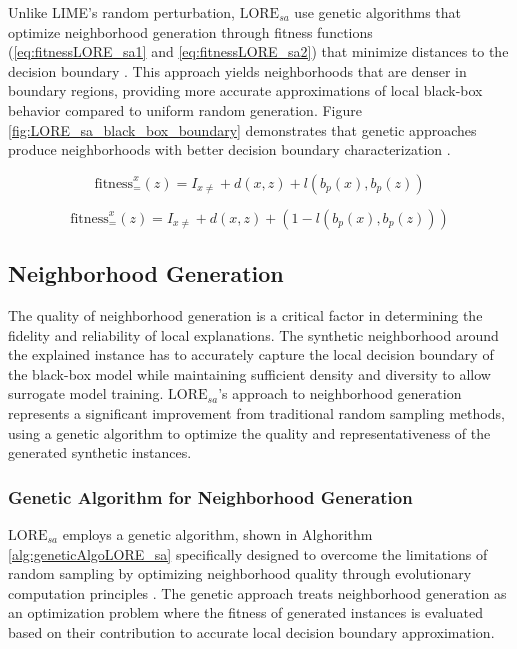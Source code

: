 Unlike LIME's random perturbation, $\text{LORE}_{sa}$ use genetic algorithms that optimize neighborhood generation through fitness functions (\ref{eq:fitnessLORE_sa1} and \ref{eq:fitnessLORE_sa2}) that minimize distances to the decision boundary \cite{guidotti2022stable}. This approach yields neighborhoods that are denser in boundary regions, providing more accurate approximations of local black-box behavior compared to uniform random generation. Figure \ref{fig:LORE_sa_black_box_boundary} demonstrates that genetic approaches produce neighborhoods with better decision boundary characterization \cite{guidotti2022stable}.

\begin{equation} 
\label{eq:fitnessLORE_sa1}
\text{fitness}^x_=(z)=I_{x\neq}+d(x,z)+l(b_p(x),b_p(z))
\end{equation}

\begin{equation} 
\label{eq:fitnessLORE_sa2}
\text{fitness}^x_=(z)=I_{x\neq}+d(x,z)+(1-l(b_p(x),b_p(z)))
\end{equation}

\subsection{Neighborhood Generation}

The quality of neighborhood generation is a critical factor in determining the fidelity and reliability of local explanations. The synthetic neighborhood around the explained instance has to accurately capture the local decision boundary of the black-box model while maintaining sufficient density and diversity to allow surrogate model training. $\text{LORE}_{sa}$'s approach to neighborhood generation represents a significant improvement from traditional random sampling methods, using a genetic algorithm to optimize the quality and representativeness of the generated synthetic instances.

\subsubsection{Genetic Algorithm for Neighborhood Generation}

$\text{LORE}_{sa}$ employs a genetic algorithm, shown in Alghorithm \ref{alg:geneticAlgoLORE_sa} specifically designed to overcome the limitations of random sampling by optimizing neighborhood quality through evolutionary computation principles \cite{guidotti2022stable}. The genetic approach treats neighborhood generation as an optimization problem where the fitness of generated instances is evaluated based on their contribution to accurate local decision boundary approximation.


